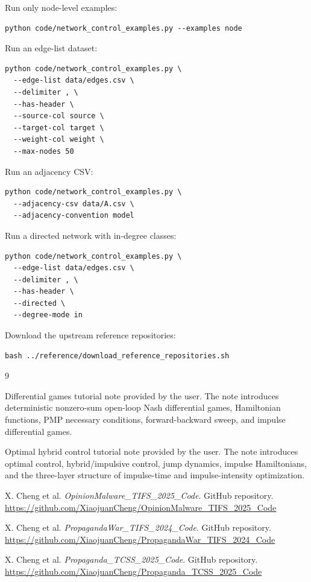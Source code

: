 \documentclass[11pt,a4paper]{article}
\begin{document}
Run only node-level examples:

\begin{lstlisting}[style=bash]
python code/network_control_examples.py --examples node
\end{lstlisting}

Run an edge-list dataset:

\begin{lstlisting}[style=bash]
python code/network_control_examples.py \
  --edge-list data/edges.csv \
  --delimiter , \
  --has-header \
  --source-col source \
  --target-col target \
  --weight-col weight \
  --max-nodes 50
\end{lstlisting}

Run an adjacency CSV:

\begin{lstlisting}[style=bash]
python code/network_control_examples.py \
  --adjacency-csv data/A.csv \
  --adjacency-convention model
\end{lstlisting}

Run a directed network with in-degree classes:

\begin{lstlisting}[style=bash]
python code/network_control_examples.py \
  --edge-list data/edges.csv \
  --delimiter , \
  --has-header \
  --directed \
  --degree-mode in
\end{lstlisting}

Download the upstream reference repositories:

\begin{lstlisting}[style=bash]
bash ../reference/download_reference_repositories.sh
\end{lstlisting}

\begin{thebibliography}{9}

Differential games tutorial note provided by the user. The note introduces deterministic nonzero-sum open-loop Nash differential games, Hamiltonian functions, PMP necessary conditions, forward-backward sweep, and impulse differential games.

Optimal hybrid control tutorial note provided by the user. The note introduces optimal control, hybrid/impulsive control, jump dynamics, impulse Hamiltonians, and the three-layer structure of impulse-time and impulse-intensity optimization.

X. Cheng et al. \emph{OpinionMalware\_TIFS\_2025\_Code}. GitHub repository.\newline
\url{https://github.com/XiaojuanCheng/OpinionMalware_TIFS_2025_Code}

X. Cheng et al. \emph{PropagandaWar\_TIFS\_2024\_Code}. GitHub repository.\newline
\url{https://github.com/XiaojuanCheng/PropagandaWar_TIFS_2024_Code}

\bibitem{propaganda}
X. Cheng et al. \emph{Propaganda\_TCSS\_2025\_Code}. GitHub repository.\newline
\url{https://github.com/XiaojuanCheng/Propaganda_TCSS_2025_Code}

\end{thebibliography}
\end{document}
